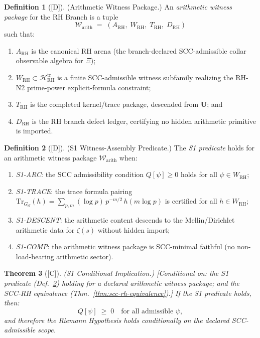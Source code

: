 \documentclass[12pt,oneside]{amsbook}
\theoremstyle{plain}
\newtheorem{theorem}{Theorem}[section]
\theoremstyle{definition}
\newtheorem{definition}[theorem]{Definition}
\theoremstyle{remark}
\newcommand{\status}[1]{\textup{[#1]}}
\begin{document}
\begin{definition}[\status{D}]\label{def:rh-arithmetic-witness}
\textup{(Arithmetic Witness Package.)}
An \emph{arithmetic witness package} for the RH Branch is a tuple
\[
 \mathcal{W}_{\mathrm{arith}} \;=\;
 (A_{\mathrm{RH}},\; W_{\mathrm{RH}},\; T_{\mathrm{RH}},\; D_{\mathrm{RH}})
\]
such that:
\begin{enumerate}[label=\textup{(\arabic*)}]
 \item $A_{\mathrm{RH}}$ is the canonical RH arena (the
 branch-declared SCC-admissible collar observable algebra
 for $\Xi$);
 \item $W_{\mathrm{RH}}\subset\mathcal{H}_{\mathrm{RH}}^{\mathrm{tr}}$
 is a finite SCC-admissible witness subfamily realizing the
 RH-N2 prime-power explicit-formula constraint;
 \item $T_{\mathrm{RH}}$ is the completed kernel/trace package,
 descended from $\mathbf{U}$; and
 \item $D_{\mathrm{RH}}$ is the RH branch defect ledger, certifying
 no hidden arithmetic primitive is imported.
\end{enumerate}
\end{definition}

\begin{definition}[\status{D}]\label{def:rh-s1-predicate}
\textup{(S1 Witness-Assembly Predicate.)}
The \emph{S1 predicate} holds for an arithmetic witness package
$\mathcal{W}_{\mathrm{arith}}$ when:
\begin{enumerate}[label=\textup{(\arabic*)}]
 \item \emph{S1-ARC}: the SCC admissibility condition
 $Q[\psi]\ge0$ holds for all $\psi\in W_{\mathrm{RH}}$;
 \item \emph{S1-TRACE}: the trace formula pairing
 $\mathrm{Tr}_{G_{\mathrm{sf}}}(h) =
 \sum_{p,m}(\log p)\,p^{-m/2}\,h(m\log p)$
 is certified for all $h\in W_{\mathrm{RH}}$;
 \item \emph{S1-DESCENT}: the arithmetic content descends to
 the Mellin/Dirichlet arithmetic data for $\zeta(s)$ without
 hidden import;
 \item \emph{S1-COMP}: the arithmetic witness package is
 SCC-minimal faithful (no non-load-bearing arithmetic sector).
\end{enumerate}
\end{definition}

\begin{theorem}[\status{C}]\label{thm:rh-s1-conditional}
\textup{(S1 Conditional Implication.)}
\textup{[Conditional on: the S1 predicate
(Def.~\ref{def:rh-s1-predicate}) holding for a declared arithmetic
witness package; and the SCC-RH equivalence
(Thm.~\ref{thm:scc-rh-equivalence}).]}
If the S1 predicate holds, then:
\[
 Q[\psi] \;\ge\; 0
 \quad\text{for all admissible }\psi,
\]
and therefore the Riemann Hypothesis holds conditionally on the
declared SCC-admissible scope.
\end{theorem}
\end{document}
